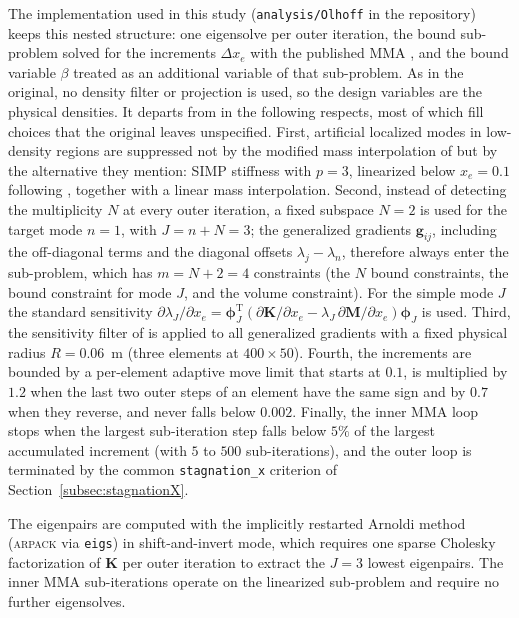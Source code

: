 \documentclass[applsci,article,submit,pdftex,moreauthors]{Definitions/mdpi}
\begin{document}
The implementation used in this study (\texttt{analysis/Olhoff} in the repository) keeps this nested structure: one eigensolve per outer iteration, the bound sub-problem solved for the increments $\Delta x_e$ with the published MMA \citep{Svanberg1987}, and the bound variable $\beta$ treated as an additional variable of that sub-problem. As in the original, no density filter or projection is used, so the design variables are the physical densities. It departs from \citet{DU2007} in the following respects, most of which fill choices that the original leaves unspecified. First, artificial localized modes in low-density regions are suppressed not by the modified mass interpolation of \citet{DU2007} but by the alternative they mention: SIMP stiffness with $p = 3$, linearized below $x_e = 0.1$ following \citet{Pedersen2000}, together with a linear mass interpolation. Second, instead of detecting the multiplicity $N$ at every outer iteration, a fixed subspace $N = 2$ is used for the target mode $n = 1$, with $J = n + N = 3$; the generalized gradients $\mathbf{g}_{ij}$, including the off-diagonal terms and the diagonal offsets $\lambda_j - \lambda_n$, therefore always enter the sub-problem, which has $m = N + 2 = 4$ constraints (the $N$ bound constraints, the bound constraint for mode $J$, and the volume constraint). For the simple mode $J$ the standard sensitivity $\partial\lambda_J/\partial x_e = \boldsymbol{\phi}_J^{\mathrm{T}}(\partial\mathbf{K}/\partial x_e - \lambda_J\,\partial\mathbf{M}/\partial x_e)\boldsymbol{\phi}_J$ is used. Third, the sensitivity filter of \citet{Sigmund1997} is applied to all generalized gradients with a fixed physical radius $R = 0.06$~m (three elements at $400\times50$). Fourth, the increments are bounded by a per-element adaptive move limit that starts at $0.1$, is multiplied by $1.2$ when the last two outer steps of an element have the same sign and by $0.7$ when they reverse, and never falls below $0.002$. Finally, the inner MMA loop stops when the largest sub-iteration step falls below $5\%$ of the largest accumulated increment (with $5$ to $500$ sub-iterations), and the outer loop is terminated by the common \texttt{stagnation\_x} criterion of Section~\ref{subsec:stagnationX}.

The eigenpairs are computed with the implicitly restarted Arnoldi method (\textsc{arpack} via \texttt{eigs}) in shift-and-invert mode, which requires one sparse Cholesky factorization of $\mathbf{K}$ per outer iteration to extract the $J = 3$ lowest eigenpairs. The inner MMA sub-iterations operate on the linearized sub-problem and require no further eigensolves.
\end{document}
